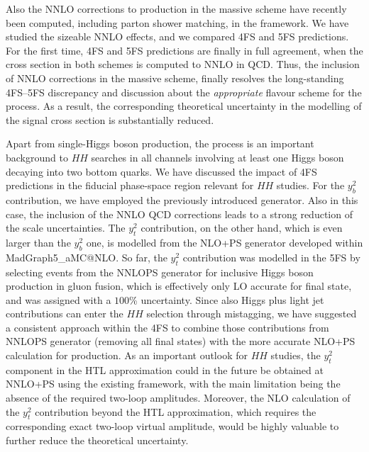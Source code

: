 \documentclass[11pt,a4paper]{article}
\begin{document}
Also the NNLO corrections to \bbH{} production in the massive scheme 
have recently been computed, including parton shower matching, in the \minnlo{} 
framework. We have studied the sizeable NNLO effects, and we compared 4FS 
and 5FS \minnlo{} predictions. For the first time, 4FS and 5FS predictions are finally
in full agreement, when the cross section in both schemes is computed to NNLO
in QCD. Thus, the inclusion of NNLO corrections in the massive scheme, finally
resolves the long-standing 4FS--5FS discrepancy and 
discussion about the {\it appropriate} flavour scheme for the \bbH{} process.
As a result, the corresponding theoretical uncertainty in the modelling of the 
\bbH{} signal cross section is substantially reduced.

Apart from single-Higgs boson production, the \bbH{} process is an important background to
$HH$ searches in all channels involving at least one Higgs boson decaying into two
bottom quarks. 
We have discussed the impact of 4FS predictions in the fiducial phase-space region
relevant for $HH$ studies. For the $y_b^2$ contribution, we have employed the
previously introduced \minnlo{} generator. Also in this case, the inclusion of the NNLO
QCD corrections leads to a strong reduction of the scale uncertainties.
The $y_t^2$ contribution, on the other hand,
which is even larger than the $y_b^2$ one, is modelled from the
NLO+PS generator developed within {\sc MadGraph5\_aMC@NLO}. 
So far, the $y_t^2$ contribution was modelled in the 5FS by selecting events 
from the \textsc{NNLOPS} generator for inclusive Higgs boson production in 
gluon fusion, which is effectively only LO accurate for \bbH{} final state, and
was assigned with a $100$\% uncertainty.
Since also Higgs plus light jet contributions can enter the $HH$ selection 
through mistagging, we have suggested a consistent approach within the 4FS
to combine those contributions from NNLOPS generator (removing all \bbH{} final states)
with the more accurate NLO+PS calculation for \bbH{} production.
As an important outlook for $HH$ studies, the $y_t^2$ \bbH{} component in the HTL approximation could in the future be obtained at NNLO+PS using the existing \minnlo{} framework, with the main limitation being the absence of the required two-loop amplitudes. Moreover, the NLO calculation of the $y_t^2$ \bbH{} contribution beyond the HTL approximation,
which requires the corresponding exact two-loop virtual amplitude, would be highly valuable to further reduce the theoretical uncertainty.
\end{document}
